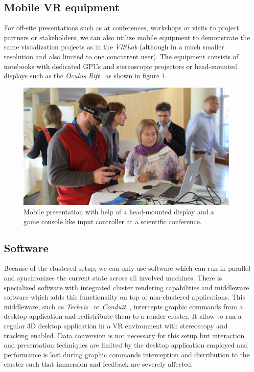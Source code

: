 \documentclass[twocolumn]{svjour3}          %
\begin{document}
\subsection{Mobile VR equipment}
\label{mobile-vr-equipment}

For off-site presentations such as at conferences, workshops or visits to project partners or stakeholders, we can also utilize mobile equipment to demonstrate the same visualization projects as in the \emph{VISLab} (although in a much smaller resolution and also limited to one concurrent user). The equipment consists of notebooks with dedicated GPUs and stereoscopic projectors or head-mounted displays such as the \emph{Oculus Rift}~\cite{web:rift} as shown in figure \ref{fig:rift}.

\begin{figure}[htb]
  \includegraphics[width=\linewidth]{images/rift.jpg}
\caption{Mobile presentation with help of a head-mounted display and a game console like input controller at a scientific conference.}
\label{fig:rift}
\end{figure}

\subsection{Software}
\label{software}

Because of the clustered setup, we can only use software which can run in parallel and synchronizes the current state across all involved machines. There is specialized software with integrated cluster rendering capabilities and middleware software which adds this functionality on top of non-clustered applications. This middleware, such as \emph{Techviz}~\cite{web:techviz} or \emph{Conduit}~\cite{web:conduit}, intercepts graphic commands from a desktop application and redistribute them to a render cluster. It allow to run a regular 3D desktop application in a VR environment with stereoscopy and tracking enabled. Data conversion is not necessary for this setup but interaction and presentation techniques are limited by the desktop application employed and performance is lost during graphic commands interception and distribution to the cluster such that immersion and feedback are severely affected.
\end{document}
